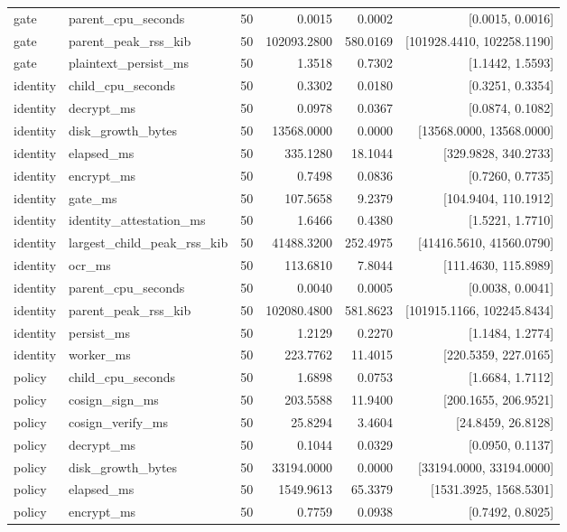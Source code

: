 \begin{tabular}{llrrrr}
gate & parent\_cpu\_seconds & 50 & 0.0015 & 0.0002 & [0.0015, 0.0016] \\
gate & parent\_peak\_rss\_kib & 50 & 102093.2800 & 580.0169 & [101928.4410, 102258.1190] \\
gate & plaintext\_persist\_ms & 50 & 1.3518 & 0.7302 & [1.1442, 1.5593] \\
identity & child\_cpu\_seconds & 50 & 0.3302 & 0.0180 & [0.3251, 0.3354] \\
identity & decrypt\_ms & 50 & 0.0978 & 0.0367 & [0.0874, 0.1082] \\
identity & disk\_growth\_bytes & 50 & 13568.0000 & 0.0000 & [13568.0000, 13568.0000] \\
identity & elapsed\_ms & 50 & 335.1280 & 18.1044 & [329.9828, 340.2733] \\
identity & encrypt\_ms & 50 & 0.7498 & 0.0836 & [0.7260, 0.7735] \\
identity & gate\_ms & 50 & 107.5658 & 9.2379 & [104.9404, 110.1912] \\
identity & identity\_attestation\_ms & 50 & 1.6466 & 0.4380 & [1.5221, 1.7710] \\
identity & largest\_child\_peak\_rss\_kib & 50 & 41488.3200 & 252.4975 & [41416.5610, 41560.0790] \\
identity & ocr\_ms & 50 & 113.6810 & 7.8044 & [111.4630, 115.8989] \\
identity & parent\_cpu\_seconds & 50 & 0.0040 & 0.0005 & [0.0038, 0.0041] \\
identity & parent\_peak\_rss\_kib & 50 & 102080.4800 & 581.8623 & [101915.1166, 102245.8434] \\
identity & persist\_ms & 50 & 1.2129 & 0.2270 & [1.1484, 1.2774] \\
identity & worker\_ms & 50 & 223.7762 & 11.4015 & [220.5359, 227.0165] \\
policy & child\_cpu\_seconds & 50 & 1.6898 & 0.0753 & [1.6684, 1.7112] \\
policy & cosign\_sign\_ms & 50 & 203.5588 & 11.9400 & [200.1655, 206.9521] \\
policy & cosign\_verify\_ms & 50 & 25.8294 & 3.4604 & [24.8459, 26.8128] \\
policy & decrypt\_ms & 50 & 0.1044 & 0.0329 & [0.0950, 0.1137] \\
policy & disk\_growth\_bytes & 50 & 33194.0000 & 0.0000 & [33194.0000, 33194.0000] \\
policy & elapsed\_ms & 50 & 1549.9613 & 65.3379 & [1531.3925, 1568.5301] \\
policy & encrypt\_ms & 50 & 0.7759 & 0.0938 & [0.7492, 0.8025] \\

\end{tabular}
